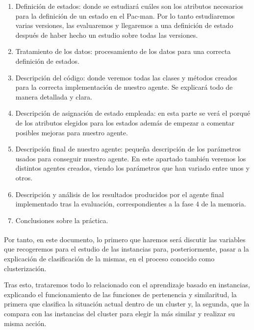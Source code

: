 \documentclass[11pt,a4paper]{article}
\begin{document}
\begin{enumerate}

\item Definición de estados: donde se estudiará cuáles son los atributos necesarios para la definición de un estado en el Pac-man. Por lo tanto estudiaremos varias versiones, las evaluaremos y llegaremos a una definición de estado después de haber hecho un estudio sobre todas las versiones.

\item Tratamiento de los datos: procesamiento de los datos para una correcta definición de estados.

\item Descripción del código: donde veremos todas las clases y métodos creados para la correcta implementación de nuestro agente. Se explicará todo de manera detallada y clara.

\item Descripción de asignación de estado empleada: en esta parte se verá el porqué de los atributos elegidos para los estados además de empezar a comentar posibles mejoras para nuestro agente.

\item Descripción final de nuestro agente: pequeña descripción de los parámetros usados para conseguir nuestro agente. En este apartado también veremos los distintos agentes creados, viendo los parámetros que han variado entre unos y otros.

\item Descripción y análisis de los resultados producidos por el agente final implementado tras la evaluación, correspondientes a la fase 4 de la memoria.

\item Conclusiones sobre la práctica.


\end{enumerate}



\paragraph{}
Por tanto, en este documento, lo primero que haremos será discutir las variables que recogeremos para el estudio de las instancias para, posteriormente, pasar a la explicación de clasificación de la mismas, en el proceso conocido como clusterización.

Tras esto, trataremos todo lo relacionado con el aprendizaje basado en instancias, explicando el funcionamiento de las funciones de pertenencia y similaritud, la primera que clasifica la situación actual dentro de un cluster y, la segunda, que la compara con las instancias del cluster para elegir la más similar y realizar su misma acción.
\end{document}
